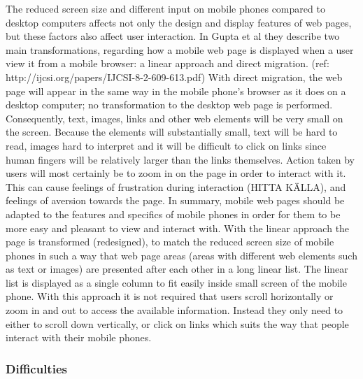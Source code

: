 The reduced screen size and different input on mobile phones compared to desktop computers affects not only the design and display features of web pages, but these factors also affect user interaction. In Gupta et al they describe two main transformations, regarding how a mobile web page is displayed when a user view it from a mobile browser: a linear approach and direct migration. (ref: http://ijcsi.org/papers/IJCSI-8-2-609-613.pdf) With direct migration, the web page will appear in the same way in the mobile phone’s browser as it does on a desktop computer; no transformation to the desktop web page is performed. Consequently, text, images, links and other web elements will be very small on the screen. Because the elements will substantially small, text will be hard to read, images hard to interpret and it will be difficult to click on links since human fingers will be relatively larger than the links themselves. Action taken by users will most certainly be to zoom in on the page in order to interact with it. This can cause feelings of frustration during interaction (HITTA KÄLLA), and feelings of aversion towards the page. In summary, mobile web pages should be adapted to the features and specifics of mobile phones in order for them to be more easy and pleasant to view and interact with.
With the linear approach the page is transformed (redesigned), to match the reduced screen size of mobile phones in such a way that web page areas (areas with different web elements such as text or images) are presented after each other in a long linear list. The linear list is displayed as a single column to fit easily inside small screen of the mobile phone. With this approach it is not required that users scroll horizontally or zoom in and out to access the available information. Instead they only need to either to scroll down vertically, or click on links which suits the way that people interact with their mobile phones.

\subsubsection{Difficulties}

